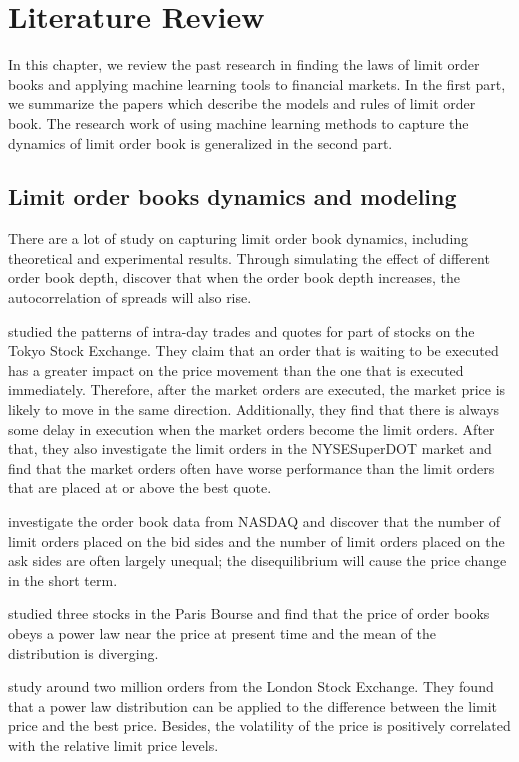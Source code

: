 \chapter{Literature Review}
In this chapter, we review the past research in finding the laws of limit order books and applying machine learning tools to financial markets. In the first part, we summarize the papers which describe the models and rules of limit order book. The research work of using machine learning methods to capture the dynamics of limit order book is generalized in the second part. 

\section{Limit order books dynamics and modeling}
There are a lot of study on capturing limit order book dynamics, including theoretical and experimental results. Through simulating the effect of different order book depth,\cite{bollerslev1993trading} discover that when the order book depth increases, the autocorrelation of spreads will also rise.

\cite{hamao1995securities} studied the patterns of intra-day trades and quotes for part of stocks on the Tokyo Stock Exchange.  They claim that an order that is waiting to be executed has a greater impact on the price movement than the one that is executed immediately. Therefore, after the market orders are executed, the market price is likely to move in the same direction. Additionally, they find that there is always some delay in execution when the market orders become the limit orders.  After that, they also investigate the limit orders in the NYSESuperDOT market and find that the market orders often have worse performance than the limit orders that are placed at or above the best quote.   

\cite{maslov2001price} investigate the order book data from NASDAQ and discover that the number of limit orders placed on the bid sides and the number of limit orders placed on the ask sides are often largely unequal; the disequilibrium will cause the price change in the short term.  

\cite{bouchaud2002statistical} studied three stocks in the Paris Bourse and find that the price of order books obeys a power law near the price at present time and the mean of the distribution is diverging.  

\cite{zovko2002power} study around two million orders from the London Stock Exchange. They found that a power law distribution can be applied to the difference between the limit price and the best price. Besides, the volatility of the price is positively correlated with the relative limit price levels. 

